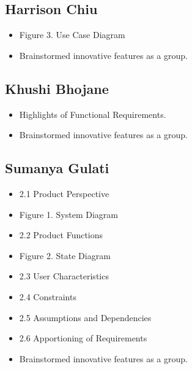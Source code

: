 \documentclass[]{article}
\begin{document}
\subsection{Harrison Chiu}
\label{subsec:harrison_chiu}
\begin{itemize}
	\item Figure 3. Use Case Diagram
	\item Brainstormed innovative features as a group.
\end{itemize}

\subsection{Khushi Bhojane}
\label{subsec:khushi_bhojane}
\begin{itemize}
	\item Highlights of Functional Requirements.
	\item Brainstormed innovative features as a group.
\end{itemize}

\subsection{Sumanya Gulati}
\label{subsec:sumanya_gulati}
\begin{itemize}
	\item 2.1 Product Perspective
	\item Figure 1. System Diagram
	\item 2.2 Product Functions
	\item Figure 2. State Diagram
	\item 2.3 User Characteristics
	\item 2.4 Constraints
	\item 2.5 Assumptions and Dependencies
	\item 2.6 Apportioning of Requirements
	\item Brainstormed innovative features as a group.
\end{itemize}
\end{document}
